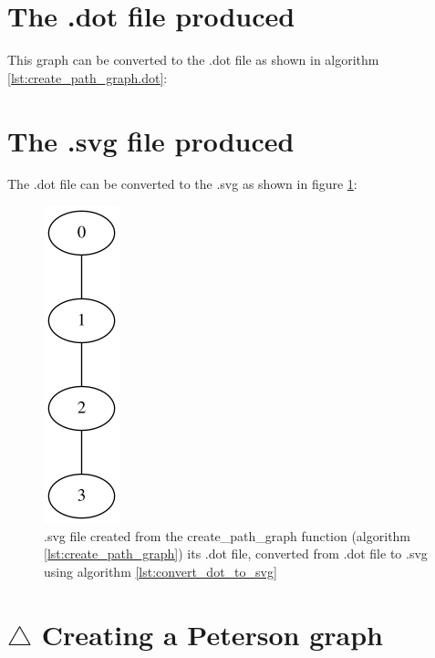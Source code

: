 \section{The .dot file produced}
\label{subsec:create_path_graph.dot}

This graph can be converted to the .dot file 
as shown in algorithm \ref{lst:create_path_graph.dot}:



\section{The .svg file produced}
\label{subsec:create_path_graph.svg}

The .dot file can be converted to the .svg 
as shown in figure \ref{fig:create_path_graph.svg}:

\begin{figure}[!htbp]
  \includegraphics[]{create_path_graph_4.png}
  \caption{
    .svg file created from the create\_path\_graph function 
    (algorithm \ref{lst:create_path_graph}) 
    its .dot file, converted from .dot file to .svg 
    using algorithm \ref{lst:convert_dot_to_svg}
  }
  \label{fig:create_path_graph.svg}
\end{figure}

\section{$\triangle$ Creating a Peterson graph}
\label{subsec:create_petersen_graph}

